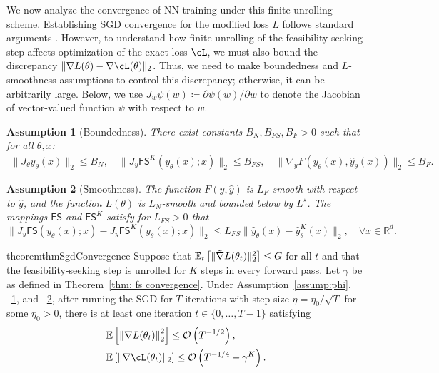 \documentclass{article}
\def\R{\mathbb{R}}
\def\FS{\mathsf{FS}}
\def\tgrad{\Tilde{\nabla}}
\newcommand{\bigO}{\mathcal{O}}
\newtheorem{assumption}{Assumption}
\def\x{x}
\def\y{y_{\theta}}   \def\hy{\hat{y}_{\theta}}    \def\ty{\Tilde{y}}
\begin{document}
We now analyze the convergence of NN training under this finite unrolling scheme. Establishing SGD convergence for the modified loss $L$ follows standard arguments \cite{shalev2014understanding}.
However, to understand how finite unrolling of the feasibility-seeking step affects optimization of the exact loss $\cL$, we must also bound the discrepancy $\| \nabla L(\theta) - \nabla \cL(\theta)\|_2$. Thus, we need to make boundedness and $L$-smoothness assumptions to control this discrepancy; otherwise, it can be arbitrarily large.
Below, we use $J_{w} \psi(w) \coloneqq \partial \psi(w)/{\partial w}$ to denote the Jacobian of vector-valued function $\psi$ with respect to $w$.

\begin{assumption}[Boundedness] \label{assump:nn-bound}
There exist constants $B_N, B_{FS}, B_F > 0$ such that for all $\theta, x$: 
    \begin{align*}
        \| J_\theta \y(\x) \|_2 \leq B_N, \quad  \|J_y \FS^K(\y(\x);\x) \|_2 \leq B_{FS}, \quad
        \|\nabla_{\hat{y}} F(\y(\x), \hy(\x)) \|_2 \leq B_F. \quad
    \end{align*}
\end{assumption}

\begin{assumption}[Smoothness] \label{assump:nn-smooth}
The function $F(y,\hat{y})$ is $L_F$-smooth with respect to $\hat{y}$, and the function $L(\theta)$ is $L_N$-smooth and bounded below by $L^{\star}$. 
The mappings $\FS$ and $\FS^K$ satisfy for $L_{FS}>0$ that
\[
\|J_y \FS(\y(\x); \x) - J_y \FS^K(\y(\x); \x) \|_2 \leq L_{FS} \| \hy(\x) - \hy^K(\x) \|_2, \quad \forall x \in \R^d.
\]
\end{assumption}

\begin{restatable}{theorem}{thmSgdConvergence}\label{thm: SGD convergence 1}
Suppose that $\mathbb{E}_t \left[ \| \tgrad L(\theta_t) \|_2^2 \right] \leq G$ for all $t$ and that the feasibility-seeking step is unrolled for $K$ steps in every forward pass. Let $\gamma$ be as defined in Theorem~\ref{thm: fs convergence}.     
    Under Assumption~\ref{assump:phi}, ~\ref{assump:nn-bound}, and ~\ref{assump:nn-smooth}, 
    after running the SGD for $T$ iterations with step size $\eta = \eta_0 / \sqrt{T}$ for some $\eta_0 > 0$, there is at least one iteration $t \in \{0, \dots, T-1\}$ satisfying 
    \begin{align}
        &\mathbb{E} \left[ \left\| \nabla L(\theta_t) \right\|_2^2 \right] \leq \bigO\left(T^{-1/2}\right),  \label{eq: thm2-bound1}\\
        &\mathbb{E} \left[\|\nabla \cL(\theta_t) \|_2\right] \leq 
        \bigO\left( T^{-1/4} + \gamma^K \right). \label{eq: thm2-bound2}
    \end{align}
\end{restatable}
\end{document}
